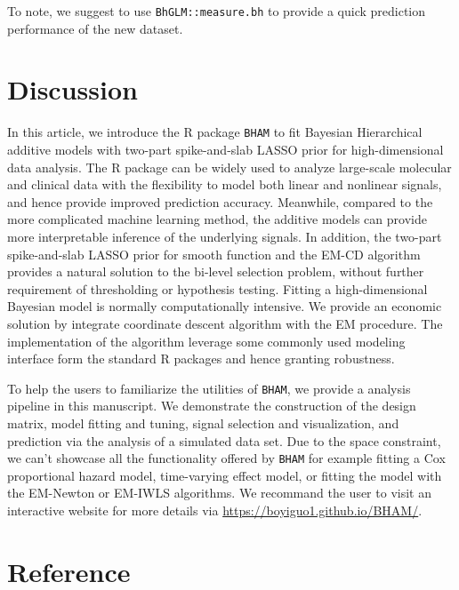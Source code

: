 \documentclass[
]{jss}
\begin{document}
To note, we suggest to use \texttt{BhGLM::measure.bh} to provide a quick
prediction performance of the new dataset.

\begin{CodeChunk}
\end{CodeChunk}

\section{Discussion}

In this article, we introduce the R package \texttt{BHAM} to fit
Bayesian Hierarchical additive models with two-part spike-and-slab LASSO
prior for high-dimensional data analysis. The R package can be widely
used to analyze large-scale molecular and clinical data with the
flexibility to model both linear and nonlinear signals, and hence
provide improved prediction accuracy. Meanwhile, compared to the more
complicated machine learning method, the additive models can provide
more interpretable inference of the underlying signals. In addition, the
two-part spike-and-slab LASSO prior for smooth function and the EM-CD
algorithm provides a natural solution to the bi-level selection problem,
without further requirement of thresholding or hypothesis testing.
Fitting a high-dimensional Bayesian model is normally computationally
intensive. We provide an economic solution by integrate coordinate
descent algorithm with the EM procedure. The implementation of the
algorithm leverage some commonly used modeling interface form the
standard R packages and hence granting robustness.

To help the users to familiarize the utilities of \texttt{BHAM}, we
provide a analysis pipeline in this manuscript. We demonstrate the
construction of the design matrix, model fitting and tuning, signal
selection and visualization, and prediction via the analysis of a
simulated data set. Due to the space constraint, we can't showcase all
the functionality offered by \texttt{BHAM} for example fitting a Cox
proportional hazard model, time-varying effect model, or fitting the
model with the EM-Newton or EM-IWLS algorithms. We recommand the user to
visit an interactive website for more details via
\url{https://boyiguo1.github.io/BHAM/}.

\clearpage
\section{Reference}


\end{document}
